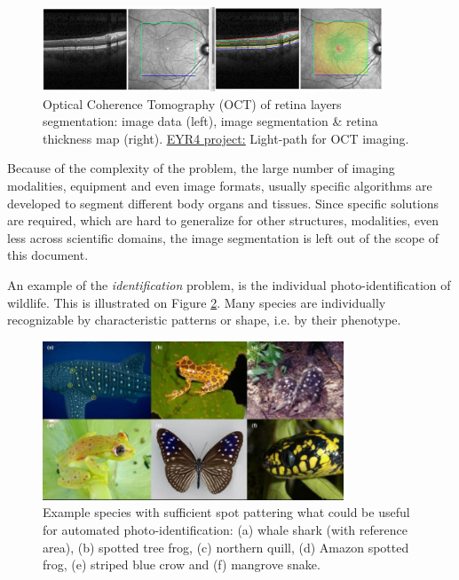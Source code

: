 \begin{figure}[H]
\begin{center}
\includegraphics[width=0.9\textwidth]{fig/oct}
\end{center}
\caption{Optical Coherence Tomography (OCT) of retina layers segmentation: image data (left), image segmentation \& retina thickness map (right). \href{https://blog.surf.nl/eyr4-blog-7-lightpath-optical-coherence-tomography-oct-imaging/}{\underline{EYR4 project:}} Light-path for OCT imaging.}
\label{fig:oct}
\end{figure}

Because of the complexity of the problem, the large number of imaging modalities, equipment and even image formats, usually specific algorithms are developed to segment different body organs and tissues. Since specific solutions are required, which are hard to generalize for other structures, modalities, even less across scientific domains, the image segmentation is left out of the scope of this document.


An example of the {\em identification} problem, is the individual photo-identification of wildlife. This is illustrated on Figure \ref{fig:photoid}. Many species are individually recognizable by characteristic patterns or shape, i.e. by their phenotype.


\begin{figure}[H]
\begin{center}
\includegraphics[width=0.8\textwidth]{fig/photoid}
\end{center}
\caption{Example species with sufficient spot pattering what could be useful for automated photo-identification: (a) whale shark (with reference area),
(b) spotted  tree frog, (c) northern quill, (d) Amazon spotted frog, (e) striped blue crow and (f) mangrove snake.}
\label{fig:photoid}
\end{figure}

